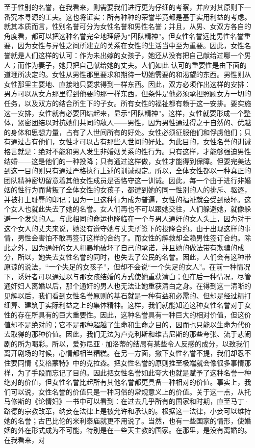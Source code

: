 \documentclass[12pt,oneside]{book}
\begin{document}
至于性别的名誉，在我看来，则需要我们进行更为仔细的考察，并应对其原则下一番究本寻源的工夫。这也将证实：所有种种的荣誉毕竟都是基于实用利益的考虑。就其本质而言，性别名誉可分为女性名誉和男性名誉；并且，从男、女双方各自的角度看，都可以把这种名誉完全地理解为“团队精神”。但女性名誉远比男性名誉重要，因为女性与异性之间所建立的关系在女性的生活当中至为重要。因此，女性名誉就是人们这样的认可：作为未出嫁的女孩子，她还从没有把自己献给过哪一个男人；而作为妻子，她只把自己献给她的丈夫。人们如此
认可的重要性是由下面的道理所决定的。女性从男性那里要求和期待一切她需要的和渴望的东西。男性则从女性那里主要地、直接地只要求得到一样东西。因此，双方必须作出这样的安排：男方可以从女方那里得到他要的那一样东西，但条件是他必须承担照顾女方一切的任务，以及双方的结合所生下的子女。所有女性的福祉都有赖于这一安排。要实施这一安排，女性就有必要团结起来，显示“团队精神”。这样，女性就要形成一个整体，紧密团结以对抗她们共同的敌人——男性，因为男性通过得之于自然的、优越的身体和思想力量，占有了人世间所有的好处。女性必须征服他们和俘虏他们；只有通过占有他们，女性才可以占有那些人世间的好处。为此目的，女性名誉的训诫格言就是：绝对不能和男人发生非婚姻关系的性行为。只有这样，才能够强迫男性结婚——这是他们的一种投降；只有通过这样做，女性才能得到保障。但要完美达到这一目的则只有通过严格执行上述的训诫规定。所以，全体女性都以一种真正的团队精神密切留意着其他女性成员是否恪守这一训诫。因此，每一个由于进行非婚姻的性行为而背叛了全体女性的女孩子，都遭到她的同一性别的人的排斥、驱逐，并被打上耻辱的印记；因为一旦这种行为成为普遍，女性的福祉就会受到破坏。这个女人也就此失去了她的名誉。女人们再也不可以跟她交往，人们躲避她，就像躲避一个发臭的人。与此相同的命运也降临在一个与男人通奸的女人头上，因为对于这个女人的丈夫来说，她没有遵守她与丈夫所签下的投降合约。由于出现这样的事情，男性会害怕不敢再签订这样的合约了。而女性的解救却全赖男性签订合约。除此之外，因为通奸的女人粗暴地破坏了自己的承诺，并且她的做法带有欺骗的成分，所以，她失去女性名誉的同时，也失去了公民的名誉。因此，人们会有这种带原谅的说法，“一个失足的女孩子”，但却不会说“一个失足的女人”。在前一种情况下，诱奸者可以通过以与那女孩结婚的方式使她重获清白；但在后一种情况，尽管通奸妇人离婚以后，那个通奸的男人也无法让她重获清白之身。在得到这一清晰的见解以后，我们看到女性名誉原则的基石就是一种有益和必需的、但却是经过精打细算、建筑于实际利益之上的集体精神。这样，我们就能知道这种女性名誉对于女性的存在所具有的巨大重要性。因此，这种名誉具有一种巨大的相对价值，但这价值却不是绝对的；它不是那种超越了生命和生命之目的，因而也只能以生命为代价去取得的那种价值。因此，我们无法为卢克利斯和维吉尼斯的那些夸张、流于悲闹剧的所为喝彩。所以，爱弥尼亚·加洛蒂的结局有某些令人反感的成分，以致我们离开剧场的时候，心情都相当糟糕。在另一方面，撇下女性名誉不提，我们却忍不住要同情《艾格蒙特》中的克拉森。把女性名誉的原则推至极端就会像很多事情那样，为了手段而忘记了目的。因此把女性名誉如此夸大也就是赋予了这种名誉一种绝对的价值，但女性名誉比起所有其他名誉都更具备一种相对的价值。事实上，我们可以说，女性名誉的价值只是一种习俗的常规意义上的价值。关于这一点，从托马修斯的《论情妇》一书中可以看到：在过去几乎所有的国家和时期，直至马丁·路德的宗教改革，纳妾在法律上是被允许和承认的。根据这一法律，小妾可以维持她的名誉；古巴比伦的米利泰庙就更不用说了。当然，也有一些国家的情形，使婚姻的外在形式成为不可能，特别是在一些天主教的国家。在那里，是没有离婚的。在我看来，对
\end{document}
